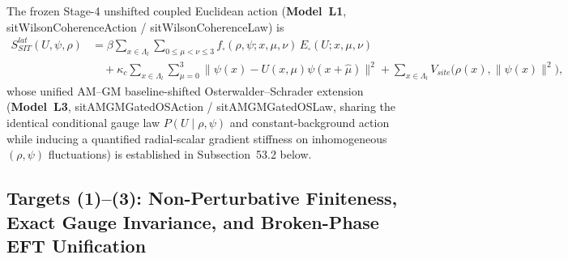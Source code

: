 \documentclass[american,11pt,letterpaper]{article}
\def\mathrm#1{#1}%
\def\texttt#1{#1}%
\begin{document}
The frozen Stage-4 unshifted coupled Euclidean action (\textbf{Model~L1}, \texttt{sit\allowbreak{}Wilson\allowbreak{}Coherence\allowbreak{}Action} / \texttt{sitWilsonCoherenceLaw}) is
\begin{equation}
\begin{aligned}
S_{\mathrm{SIT}}^{\mathrm{lat}}(U,\psi,\rho)
&= \beta\sum_{x\in\Lambda_l}\sum_{0\le\mu<\nu\le 3} f_\square(\rho,\psi;x,\mu,\nu)\,E_\square(U;x,\mu,\nu)\\
&\quad + \kappa_c\sum_{x\in\Lambda_l}\sum_{\mu=0}^3 \bigl\|\psi(x) - U(x,\mu)\psi(x+\hat{\mu})\bigr\|^2
  + \sum_{x\in\Lambda_l} V_{\mathrm{site}}\bigl(\rho(x), \|\psi(x)\|^2\bigr),
\end{aligned}
\label{eq:full_sit_lattice_action}
\end{equation}
whose unified AM--GM baseline-shifted Osterwalder--Schrader extension (\textbf{Model~L3}, \texttt{sitAMGMGatedOSAction} / \texttt{sitAMGMGatedOSLaw}, sharing the identical conditional gauge law $P(U\mid\rho,\psi)$ and constant-background action while inducing a quantified radial-scalar gradient stiffness on inhomogeneous $(\rho,\psi)$ fluctuations) is established in Subsection~53.2 below.

\subsection{Targets (1)--(3): Non-Perturbative Finiteness, Exact Gauge Invariance, and Broken-Phase EFT Unification}
\end{document}
